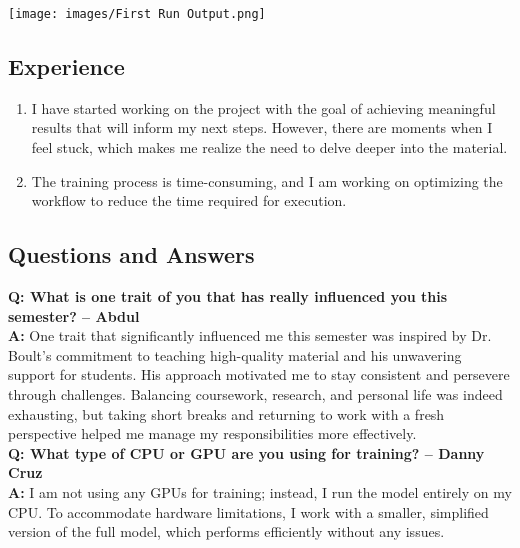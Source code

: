 ﻿\documentclass{article}
\begin{document}
\begin{center}
    \texttt{[image: images/First Run Output.png]}
\end{center}

\subsection*{Experience}

\begin{enumerate}
    \item I have started working on the project with the goal of achieving meaningful results that will inform my next steps. However, there are moments when I feel stuck, which makes me realize the need to delve deeper into the material.
    
    \item The training process is time-consuming, and I am working on optimizing the workflow to reduce the time required for execution.
\end{enumerate}

\subsection*{Questions and Answers}

\textbf{Q: What is one trait of you that has really influenced you this semester? -- Abdul} \\
\textbf{A:} One trait that significantly influenced me this semester was inspired by Dr. Boult's commitment to teaching high-quality material and his unwavering support for students. His approach motivated me to stay consistent and persevere through challenges. Balancing coursework, research, and personal life was indeed exhausting, but taking short breaks and returning to work with a fresh perspective helped me manage my responsibilities more effectively.\\

\textbf{Q: What type of CPU or GPU are you using for training? -- Danny Cruz} \\
\textbf{A:} I am not using any GPUs for training; instead, I run the model entirely on my CPU. To accommodate hardware limitations, I work with a smaller, simplified version of the full model, which performs efficiently without any issues.
\end{document}
